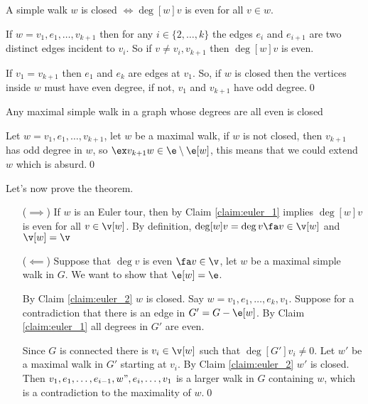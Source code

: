 \begin{prf}
    \begin{claim}
    \label{claim:euler_1}
        A simple walk $w$ is closed $\iff \deg[w]{v}$ is even for all $v \in w$.
    \end{claim}
    \begin{prf}
        If $w = v_1, e_1, \dots, v_{k + 1}$ then for any $i \in \{2, \dots, k\}$ the edges $e_i$ and $e_{i + 1}$ are two distinct edges incident to $v_i$. So if $v \neq v_i, v_{k + 1}$ then $\deg[w]{v}$ is even.

        If $v_1 = v_{k + 1}$ then $e_1$ and $e_k$ are edges at $v_1$. So, if $w$ is closed then the vertices inside $w$ must have even degree, if not, $v_1$ and $v_{k + 1}$ have odd degree.\qed
    \end{prf}
    \begin{claim}
    \label{claim:euler_2}
        Any maximal simple walk in a graph whose degrees are all even is closed
    \end{claim}
    \begin{prf}
        Let $w = v_1, e_1, \dots, v_{k + 1}$, let $w$ be a maximal walk, if $w$ is not closed, then $v_{k + 1}$ has odd degree in $w$, so $\ex v_{k + 1}w \in \e \setminus \e[w]$, this means that we could extend $w$ which is absurd.\qed
    \end{prf}
    Let's now prove the theorem.

    \begin{enumerate}
        \item[($\implies$)] If $w$ is an Euler tour, then by Claim \ref{claim:euler_1} implies $\deg[w]{v}$ is even for all $v \in \v[w]$. By definition, $\deg[w]{v} = \deg{v} \fa v \in \v[w]$ and $\v[w] = \v$
        \item[($\impliedby$)] Suppose that $\deg{v}$ is even $\fa v \in \v$, let $w$ be a maximal simple walk in $G$. We want to show that $\e[w] = \e$.
        
        By Claim \ref{claim:euler_2} $w$ is closed. Say $w = v_1, e_1, \dots, e_k, v_1$. Suppose for a contradiction that there is an edge in $G' = G - \e[w]$. By Claim \ref{claim:euler_1} all degrees in $G'$ are even.

        Since $G$ is connected there is $v_i \in \v[w]$ such that $\deg[G']{v_i} \neq 0$. Let $w'$ be a maximal walk in $G'$ starting at $v_i$. By Claim \ref{claim:euler_2} $w'$ is closed. Then $v_1, e_1, \dots, e_{i - 1}, w", e_i, \dots, v_1$ is a larger walk in $G$ containing $w$, which is a contradiction to the maximality of $w$.\qed
    \end{enumerate}
\end{prf}
